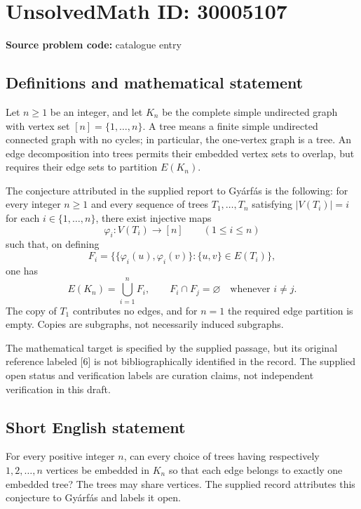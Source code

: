 \documentclass[11pt]{article}
\begin{document}
\section*{UnsolvedMath ID: 30005107}
\textbf{Source problem code:} catalogue entry
\subsection{Definitions and mathematical statement}
Let \(n\geq 1\) be an integer, and let \(K_n\) be the complete simple undirected graph with vertex set \([n]=\{1,\ldots,n\}\). A tree means a finite simple undirected connected graph with no cycles; in particular, the one-vertex graph is a tree. An edge decomposition into trees permits their embedded vertex sets to overlap, but requires their edge sets to partition \(E(K_n)\).

The conjecture attributed in the supplied report to Gy\'arf\'as is the following: for every integer \(n\geq 1\) and every sequence of trees \(T_1,\ldots,T_n\) satisfying \(|V(T_i)|=i\) for each \(i\in\{1,\ldots,n\}\), there exist injective maps
\[
\varphi_i:V(T_i)\longrightarrow[n]\qquad(1\leq i\leq n)
\]
such that, on defining
\[
F_i=\bigl\{\{\varphi_i(u),\varphi_i(v)\}:\{u,v\}\in E(T_i)\bigr\},
\]
one has
\[
E(K_n)=\bigcup_{i=1}^{n}F_i,
\qquad
F_i\cap F_j=\varnothing\quad\text{whenever }i\ne j.
\]
The copy of \(T_1\) contributes no edges, and for \(n=1\) the required edge partition is empty. Copies are subgraphs, not necessarily induced subgraphs.

The mathematical target is specified by the supplied passage, but its original reference labeled [6] is not bibliographically identified in the record. The supplied open status and verification labels are curation claims, not independent verification in this draft.
\subsection{Short English statement}
For every positive integer \(n\), can every choice of trees having respectively \(1,2,\ldots,n\) vertices be embedded in \(K_n\) so that each edge belongs to exactly one embedded tree? The trees may share vertices. The supplied record attributes this conjecture to Gy\'arf\'as and labels it open.
\end{document}
